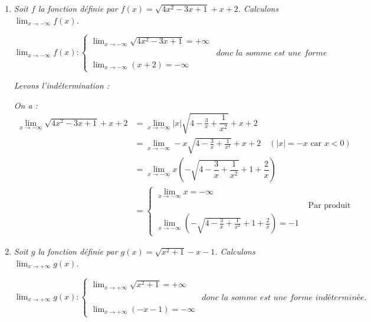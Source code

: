 \documentclass[12pt,a4paper]{article}
\begin{document}
\begin{enumerate}
    \item \textit{Soit $f$ la fonction définie par $f(x) = \sqrt{4x^2 - 3x + 1} + x + 2$. Calculons $\displaystyle \lim_{x \to -\infty} f(x)$.}
    
    \vspace{0.1cm}
    
    $
    \displaystyle \lim_{x \to -\infty} f(x):
    \begin{cases}
    \displaystyle \lim_{x \to -\infty} \sqrt{4x^2 - 3x + 1} = +\infty\\[3mm]
    &\textit{donc la somme est une forme indéterminée.}\\
    \displaystyle \lim_{x \to -\infty} (x + 2) = -\infty
    \end{cases}
    $

    \textit{Levons l'indétermination :}
    
    \textit{On a :}
    \begin{align*}
        \displaystyle \lim_{x \to -\infty} \sqrt{4x^2 - 3x + 1} + x + 2 &= \lim_{x \to -\infty} |x|\sqrt{4 - \frac{3}{x} + \dfrac{1}{x^2}} + x + 2 \\
        &=\lim_{x \to -\infty} -x\sqrt{4 - \frac{3}{x} + \frac{1}{x^2}} + x + 2 \quad (|x| = -x \text{ car } x < 0) \\
        &=\lim_{x \to -\infty} x \left( -\sqrt{4 - \dfrac{3}{x} + \dfrac{1}{x^2}} + 1 + \dfrac{2}{x} \right)\\
        &=\begin{cases}
    \displaystyle \lim_{x \to -\infty} x = -\infty \\[3mm]
    &\text{ Par produit }\\
    \displaystyle \lim_{x \to -\infty} \left( -\sqrt{4 - \frac{3}{x} + \frac{1}{x^2}} + 1 + \frac{2}{x} \right) = -1
    \end{cases}
    \end{align*}
    
    \vspace{0.2cm}
    
     
    
    \item \textit{Soit $g$ la fonction définie par $g(x) = \sqrt{x^2 + 1} - x - 1$. Calculons $\displaystyle \lim_{x \to +\infty} g(x)$.}
    
    \vspace{0.1cm}
    
    $
    \displaystyle \lim_{x \to +\infty} g(x):
    \begin{cases}
    \displaystyle \lim_{x \to +\infty} \sqrt{x^2 + 1} = +\infty\\[3mm]
    &\textit{donc la somme est une forme indéterminée.}\\
    \displaystyle \lim_{x \to +\infty} (-x - 1) = -\infty
    \end{cases}
    $


\end{enumerate}
\end{document}
